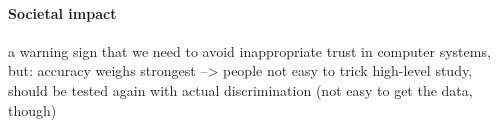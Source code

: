 \paragraph{Societal impact}
a warning sign that we need to avoid inappropriate trust in computer systems, but:
accuracy weighs strongest --> people not easy to trick
high-level study, should be tested again with actual discrimination (not easy to get the data, though)

